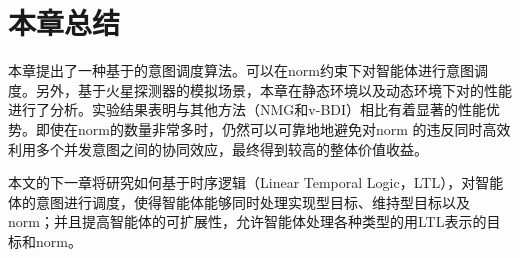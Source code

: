 \section{本章总结}
本章提出了一种基于\SA 的意图调度算法\SAN 。\SAN 可以在norm约束下对智能体进行意图调度。另外，基于火星探测器的模拟场景，本章在静态环境以及动态环境下对\SAN 的性能进行了分析。实验结果表明\SAN 与其他方法（NMG和v-BDI）相比有着显著的性能优势。即使在norm的数量非常多时，\SAN 仍然可以可靠地地避免对norm
的违反同时高效利用多个并发意图之间的协同效应，最终得到较高的整体价值收益。

本文的下一章将研究如何基于时序逻辑（Linear Temporal Logic，LTL），对智能体的意图进行调度，使得智能体能够同时处理实现型目标、维持型目标以及norm；并且提高智能体的可扩展性，允许智能体处理各种类型的用LTL表示的目标和norm。
